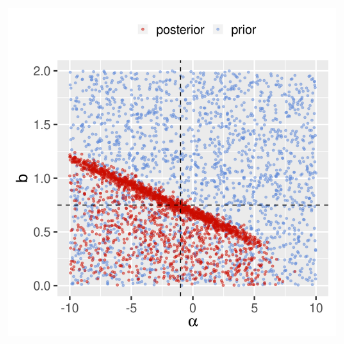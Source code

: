 \documentclass[a4paper]{article}            %
\begin{document}
\begin{slidetop}
    \begin{center}
        \includegraphics[width=0.65\textwidth]{prior_posterior_scatter_Q_alpha_b.png}%
    \end{center}
    
\end{slidetop}
\end{document}
